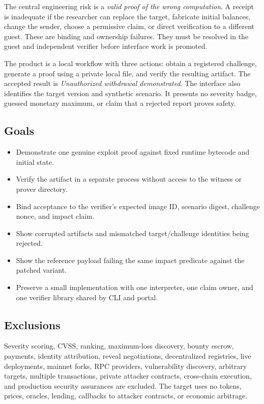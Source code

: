 \documentclass[11pt]{article}
\begin{document}
The central engineering risk is a \emph{valid proof of the wrong computation}. A receipt is inadequate if the researcher can replace the target, fabricate initial balances, change the sender, choose a permissive claim, or direct verification to a different guest. These are binding and ownership failures. They must be resolved in the guest and independent verifier before interface work is promoted.

The product is a local workflow with three actions: obtain a registered challenge, generate a proof using a private local file, and verify the resulting artifact. The accepted result is \emph{Unauthorized withdrawal demonstrated}. The interface also identifies the target version and synthetic scenario. It presents no severity badge, guessed monetary maximum, or claim that a rejected report proves safety.

\subsection{Goals}
\begin{itemize}
\item Demonstrate one genuine exploit proof against fixed runtime bytecode and initial state.
\item Verify the artifact in a separate process without access to the witness or prover directory.
\item Bind acceptance to the verifier's expected image ID, scenario digest, challenge nonce, and impact claim.
\item Show corrupted artifacts and mismatched target/challenge identities being rejected.
\item Show the reference payload failing the same impact predicate against the patched variant.
\item Preserve a small implementation with one interpreter, one claim owner, and one verifier library shared by CLI and portal.
\end{itemize}

\subsection{Exclusions}
Severity scoring, CVSS, ranking, maximum-loss discovery, bounty escrow, payments, identity attribution, reveal negotiations, decentralized registries, live deployments, mainnet forks, RPC providers, vulnerability discovery, arbitrary targets, multiple transactions, private attacker contracts, cross-chain execution, and production security assurances are excluded. The target uses no tokens, prices, oracles, lending, callbacks to attacker contracts, or economic arbitrage.
\end{document}
